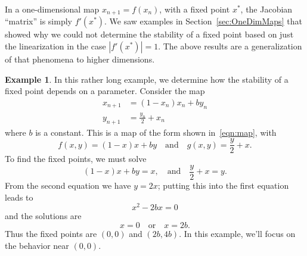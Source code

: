 \documentclass[reqno]{immbook}
\numberwithin{equation}{chapter}
\numberwithin{question}{section}
\numberwithin{theorem}{chapter}
\numberwithin{figure}{chapter}
\theoremstyle{definition}
\newtheorem{example}{Example}[section]
\begin{document}
In a one-dimensional map $x_{n+1} = f(x_n)$, with a fixed
point $x^*$, the 
Jacobian ``matrix'' is simply $f'(x^*)$.  We saw examples
in Section~\ref{sec:OneDimMaps} that showed why we could not determine
the stability of a fixed point based on just the linearization
in the case $|f'(x^*)|=1$.  The above results are a generalization
of that phenomena to higher dimensions.


\begin{example}
In this rather long example, we determine
how the stability of a fixed point depends on a parameter.
Consider the map
\begin{equation}
\begin{split}
  x_{n+1} & = (1- x_n)x_n + b y_n \\
  y_{n+1} & = \frac{y_n}{2} + x_n
\end{split}
\label{eqn:linearizationexample}
\end{equation}
where $b$ is a constant.
This is a map of the form shown in~\eqref{eqn:map}, with
\begin{equation}
   f(x,y) = (1-x)x+by \quad \textrm{and} \quad g(x,y) = \frac{y}{2}+x.
\end{equation}
To find the fixed points, we must solve
\begin{equation}
   (1 - x)x + by = x, \quad \textrm{and} \quad \frac{y}{2}+x = y.
\end{equation}
From the second equation we have $y = 2x$; putting this into the first equation
leads to
\begin{equation}
   x^2-2bx = 0
\end{equation}
and the solutions are
\begin{equation}
  x = 0 \quad \textrm{or} \quad x= 2b.
\end{equation}
Thus the fixed points are
$(0,0)$ and $(2b,4b)$.
In this example, we'll focus on the behavior near $(0,0)$.


\end{example}
\end{document}
